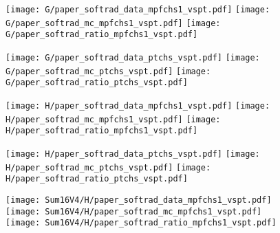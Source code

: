 \documentclass[landscape,10pt]{beamer} %
\newcommand{\commentout}[1]{}
\begin{document}
\newpage
\commentout{
\begin{figure}[p]
\centering
  \texttt{[image: L4/paper\_softrad\_data\_mpfchs1\_vspt.pdf]}
  \texttt{[image: L4/paper\_softrad\_mc\_mpfchs1\_vspt.pdf]}
  \texttt{[image: L4/paper\_softrad\_ratio\_mpfchs1\_vspt.pdf]}
\end{figure}

\begin{figure}[p]
\centering
  \texttt{[image: L4/paper\_softrad\_data\_ptchs\_vspt.pdf]}
  \texttt{[image: L4/paper\_softrad\_mc\_ptchs\_vspt.pdf]}
  \texttt{[image: L4/paper\_softrad\_ratio\_ptchs\_vspt.pdf]}
\end{figure}
} %

\newpage

\begin{figure}[p]
\centering
  \texttt{[image: G/paper\_softrad\_data\_mpfchs1\_vspt.pdf]}
  \texttt{[image: G/paper\_softrad\_mc\_mpfchs1\_vspt.pdf]}
  \texttt{[image: G/paper\_softrad\_ratio\_mpfchs1\_vspt.pdf]}
\end{figure}

\begin{figure}[p]
\centering
  \texttt{[image: G/paper\_softrad\_data\_ptchs\_vspt.pdf]}
  \texttt{[image: G/paper\_softrad\_mc\_ptchs\_vspt.pdf]}
  \texttt{[image: G/paper\_softrad\_ratio\_ptchs\_vspt.pdf]}
\end{figure}

\newpage

\begin{figure}[p]
\centering
  \texttt{[image: H/paper\_softrad\_data\_mpfchs1\_vspt.pdf]}
  \texttt{[image: H/paper\_softrad\_mc\_mpfchs1\_vspt.pdf]}
  \texttt{[image: H/paper\_softrad\_ratio\_mpfchs1\_vspt.pdf]}
\end{figure}

\begin{figure}[p]
\centering
  \texttt{[image: H/paper\_softrad\_data\_ptchs\_vspt.pdf]}
  \texttt{[image: H/paper\_softrad\_mc\_ptchs\_vspt.pdf]}
  \texttt{[image: H/paper\_softrad\_ratio\_ptchs\_vspt.pdf]}
\end{figure}

\newpage

\begin{figure}[p]
\centering
  \texttt{[image: Sum16V4/H/paper\_softrad\_data\_mpfchs1\_vspt.pdf]}
  \texttt{[image: Sum16V4/H/paper\_softrad\_mc\_mpfchs1\_vspt.pdf]}
  \texttt{[image: Sum16V4/H/paper\_softrad\_ratio\_mpfchs1\_vspt.pdf]}
\end{figure}
\end{document}
